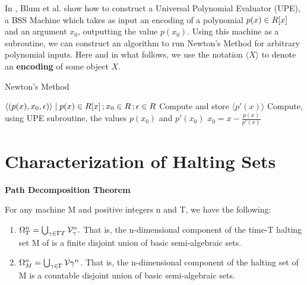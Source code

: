   \begin{example}
    In \cite{B98}, Blum et al. show how to construct a Universal
    Polynomial Evaluator (UPE), a BSS Machine which takes as input an
    encoding of a polynomial $p(x) \in R[x]$ and an argument
    $x_0$, outputting the value $p(x_0)$.  Using this machine as a
    subroutine, we can construct an algorithm to run Newton's Method
    for arbitrary polynomial inputs.  Here and in what follows, we use
    the notation $\langle X \rangle$ to denote an \textbf{encoding} of
    some object $X$.

    \begin{algorithm}
      \caption{Newton's Method} \label{alg:newton}
      \begin{algorithmic}
        \Require $\langle (p(x), x_0, \epsilon) \rangle \mid p(x) \in R[x]\,; x_0 \in R\,; \epsilon \in R$
        \State Compute and store $\langle p'(x) \rangle$
        \State Compute, using UPE subroutine, the values $p(x_0)$ and $p'(x_0)$
        \State $x_0 = x - \frac{p(x)}{p'(x)}$
        \EndWhile
      \end{algorithmic}
    \end{algorithm}
  \end{example}


  \section{Characterization of Halting Sets}

  \begin{theorem}{\textbf{Path Decomposition Theorem}}
    
    For any machine M and positive integers n and T, we have the
    following:

    \begin{enumerate}
    \item $\Omega_T^n = \bigcup_{\gamma \in \Gamma{T}}
      \mathcal{V}_\gamma^n.$ That is, the n-dimensional
      component of the time-T halting set M of is a finite disjoint union
      of basic semi-algebraic sets.
    \item $\Omega_M^n = \bigcup_{\gamma \in \Gamma{}}
      \mathcal{V}{\gamma}^n$.  That is, the n-dimensional
      component of the halting set of M is a countable disjoint union
      of basic semi-algebraic sets.
    \end{enumerate}
  \end{theorem}

